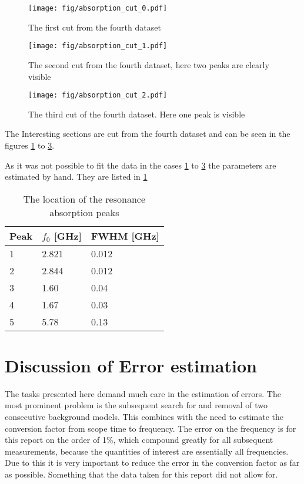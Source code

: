\begin{figure}[tb]
	\texttt{[image: fig/absorption\_cut\_0.pdf]}
	\caption{The first cut from the fourth dataset}
	\label{fig:absorption_cut_0}
\end{figure}
\begin{figure}[tb]
	\texttt{[image: fig/absorption\_cut\_1.pdf]}
	\caption{The second cut from the fourth dataset, here two peaks are clearly visible}
	\label{fig:absorption_cut_1}
\end{figure}
\begin{figure}[tb]
	\texttt{[image: fig/absorption\_cut\_2.pdf]}
	\caption{The third cut of the fourth dataset. Here one peak is visible}
	\label{fig:absorption_cut_2}
\end{figure}

The Interesting sections are cut from the fourth dataset and can be seen in the figures \ref{fig:absorption_cut_0} to \ref{fig:absorption_cut_2}.

As it was not possible to fit the data in the cases \ref{fig:absorption_cut_0} to \ref{fig:absorption_cut_2} the parameters are estimated by hand.
They are listed in \ref{tab:absorption_peaks}

\begin{table}
	\begin{center}
		\begin{tabular}{|m{10em} m{10em} m{10em}|}
			\hline
			\textbf{Peak} & $f_0$ [GHz] & \textbf{FWHM} [GHz] \\
			\hline\hline
			1 & 2.821 & 0.012 \\
			2 & 2.844 & 0.012 \\
			3 & 1.60 & 0.04 \\
			4 & 1.67 & 0.03 \\
			5 & 5.78 & 0.13 \\
			\hline
		\end{tabular}
		\caption{The location of the resonance absorption peaks}
		\label{tab:absorption_peaks}
	\end{center}
\end{table}

\section{Discussion of Error estimation}
The tasks presented here demand much care in the estimation of errors. The most prominent problem is the subsequent search for and removal of two
consecutive background models. This combines with the need to estimate the conversion factor from scope time to frequency.
The error on the frequency is for this report on the order of 1\%, which compound greatly for all subsequent measurements, because the quantities of
interest are essentially all frequencies. Due to this it is very important to reduce the error in the conversion factor as far as possible. Something
that the data taken for this report did not allow for.

